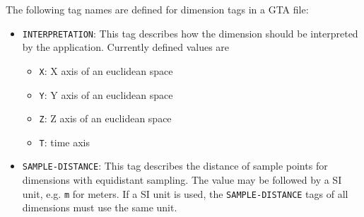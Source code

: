 \documentclass[a4paper,11pt]{article}
\newcommand{\code}[1]{\texttt{#1}}
\begin{document}
The following tag names are defined for dimension tags in a GTA file:
\begin{itemize}
\item \code{INTERPRETATION}: This tag describes how the dimension
should be interpreted by the application. Currently defined values are
	\begin{itemize}
	\item \code{X}: X axis of an euclidean space
	\item \code{Y}: Y axis of an euclidean space
	\item \code{Z}: Z axis of an euclidean space
	\item \code{T}: time axis
	\end{itemize}
\item \code{SAMPLE-DISTANCE}: This tag describes the distance of sample points
for dimensions with equidistant sampling. The value may be followed by a SI unit,
e.g. \code{m} for meters. If a SI unit is used, the \code{SAMPLE-DISTANCE} tags
of all dimensions must use the same unit.
\end{itemize}


\newpage
\renewcommand{\large}{\small}
\renewcommand{\Large}{\normalsize}
\newcommand{\chapter}[3][\relax]{\section*{#3}\footnotesize}

\end{document}
